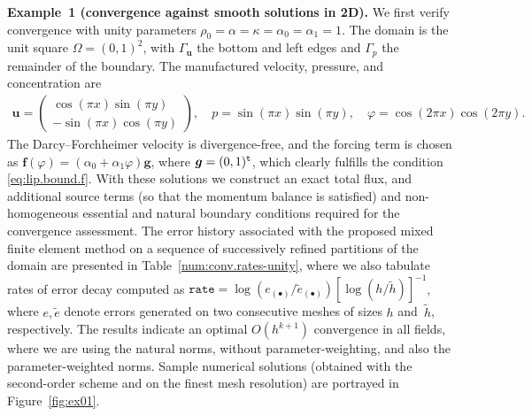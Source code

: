 \documentclass[11pt, reqno, a4paper, twoside]{article}
\newcommand{\bu}{\boldsymbol{u}}
\renewcommand{\bf}{\boldsymbol{f}}
\newcommand{\bg}{\boldsymbol{g}}
\numberwithin{equation}{section}
\numberwithin{remark}{section}
\numberwithin{figure}{section}
\numberwithin{table}{section}
\begin{document}
\smallskip
\noindent\textbf{Example~1 (convergence against smooth solutions in 2D).}
We first verify convergence with  unity parameters $\rho_0 = \alpha = \kappa = \alpha_0 = \alpha_1 =1.$ The domain is the unit square $\Omega = (0,1)^2$, with $\Gamma_{\bu}$ the bottom and left edges and $\Gamma_p$ the remainder of the boundary. The manufactured velocity, pressure, and concentration are 
\begin{gather*}
 \bu = \begin{pmatrix}
     \cos(\pi x)\sin(\pi y)\\-\sin(\pi x) \cos(\pi y)
 \end{pmatrix}, \quad p = \sin(\pi x) \sin (\pi y), 
 \quad \varphi = \cos(2\pi x) \cos (2\pi y).
\end{gather*}
The Darcy--Forchheimer velocity is divergence-free, and the forcing term is chosen as 
$ \bf(\varphi) = (\alpha_0 + \alpha_1 \varphi) \bg$, where $\bg = (0,1)^{\tt t}$, which clearly fulfills the condition \eqref{eq:lip.bound.f}. With these solutions we construct an exact total flux, and additional source terms {(so that the momentum balance is satisfied)} and non-homogeneous essential and natural boundary conditions required for the convergence assessment. The error history associated with the 
proposed mixed finite element  method on a sequence of successively refined partitions of the domain  are presented in Table~\ref{num:conv.rates-unity}, where we also tabulate rates of error decay computed as 
$\texttt{rate}  =\log(e_{(\bullet)}/\tilde{e}_{(\bullet)})[\log(h/\tilde{h})]^{-1}$,
where $e,\tilde{e}$ denote errors generated on two
consecutive  meshes of sizes $h$ and~$\tilde{h}$, respectively. The results indicate an optimal $O(h^{k+1})$ convergence in all fields, where we are using the natural norms, without parameter-weighting, and also the parameter-weighted norms. {Sample numerical solutions (obtained with the second-order scheme and on the finest mesh resolution) are portrayed in Figure~\ref{fig:ex01}.}
\end{document}
